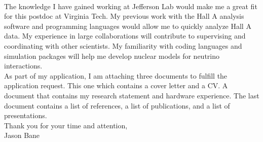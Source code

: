 \paragraph{}The knowledge I have gained working at Jefferson Lab would make me a great fit for this postdoc at Virginia Tech. My previous work with the Hall A analysis software and programming languages would allow me to quickly analyze Hall A data. My experience in large collaborations will  contribute to supervising and coordinating with other scientists. My familiarity with coding languages and simulation packages will help me develop nuclear models for neutrino interactions.\\

As part of my application, I am attaching three documents to fulfill the application request. This one which contains a cover letter and a CV. A document that contains my research statement and hardware experience. The last document contains a list of references, a list of publications, and a list of presentations. \\

\noindent Thank you for your time and attention,\\
\noindent Jason Bane